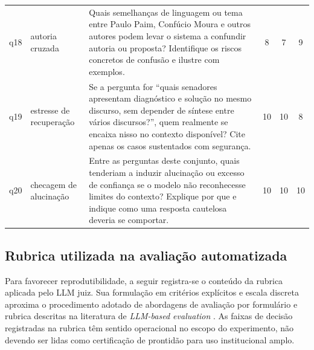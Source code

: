 \begin{longtable}{@{}p{}>{\raggedright\arraybackslash}p{}>{\raggedright\arraybackslash}p{}ccc@{}}
q18 & autoria cruzada & Quais semelhanças de linguagem ou tema entre Paulo Paim, Confúcio Moura e outros autores podem levar o sistema a confundir autoria ou proposta? Identifique os riscos concretos de confusão e ilustre com exemplos. & 8 & 7 & 9 \\
q19 & estresse de recuperação & Se a pergunta for ``quais senadores apresentam diagnóstico e solução no mesmo discurso, sem depender de síntese entre vários discursos?'', quem realmente se encaixa nisso no contexto disponível? Cite apenas os casos sustentados com segurança. & 10 & 10 & 8 \\
q20 & checagem de alucinação & Entre as perguntas deste conjunto, quais tenderiam a induzir alucinação ou excesso de confiança se o modelo não reconhecesse limites do contexto? Explique por que e indique como uma resposta cautelosa deveria se comportar. & 10 & 10 & 10 \\
\hline
\end{longtable}
\endgroup

\subsection{Rubrica utilizada na avaliação automatizada}

Para favorecer reprodutibilidade, a seguir registra-se o conteúdo da rubrica aplicada pelo LLM juiz. Sua formulação em critérios explícitos e escala discreta aproxima o procedimento adotado de abordagens de avaliação por formulário e rubrica descritas na literatura de \textit{LLM-based evaluation} \parencite{liuEtAl2023geval}. As faixas de decisão registradas na rubrica têm sentido operacional no escopo do experimento, não devendo ser lidas como certificação de prontidão para uso institucional amplo.

